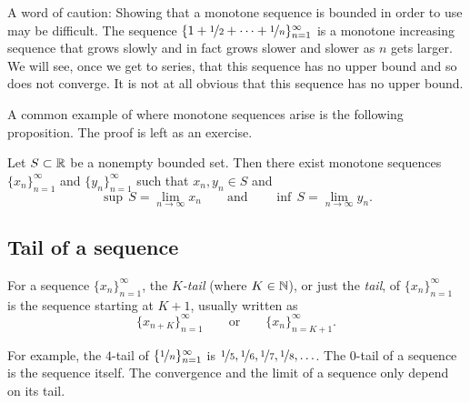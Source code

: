 \begin{example}
A word of caution:  Showing that a monotone sequence is bounded
in order to use  may be difficult.
The sequence
$\{ 1 + \nicefrac{1}{2} + \cdots + \nicefrac{1}{n} \}_{n=1}^\infty$
is a monotone increasing
sequence that grows slowly and in fact grows slower and slower as $n$ gets
larger.  We will see, once we get to series,
that this sequence has no upper bound and so does not converge.  It is not
at all obvious that this sequence has no upper bound.
\end{example}

A common example of where monotone sequences arise is the following
proposition.  The proof is left as an exercise.

\begin{prop} \label{prop:supinfseq}
Let $S \subset {\mathbb{R}}$ be a nonempty bounded set.
Then there exist monotone sequences
$\{ x_n \}_{n=1}^\infty$ and $\{ y_n \}_{n=1}^\infty$ such that $x_n, y_n \in S$ and
\begin{equation*}
\sup\,S = \lim_{n\to \infty} x_n \qquad \text{and} \qquad \inf\,S =
\lim_{n\to\infty} y_n .
\end{equation*}
\end{prop}

\subsection{Tail of a sequence}

\begin{defn}
For a sequence $\{ x_n \}_{n=1}^\infty$,
the \emph{$K$-tail} (where $K \in {\mathbb{N}}$),
or just the
\emph{tail}, of
$\{ x_n \}_{n=1}^\infty$ is the sequence starting at $K+1$, usually written as
\begin{equation*}
\{ x_{n+K} \}_{n=1}^\infty
\qquad \text{or} \qquad \{ x_n \}_{n=K+1}^\infty .
\end{equation*}
\end{defn}

For example, the $4$-tail of $\{ \nicefrac{1}{n} \}_{n=1}^\infty$ is
$\nicefrac{1}{5}, \nicefrac{1}{6}, \nicefrac{1}{7}, \nicefrac{1}{8},
\ldots$.  The $0$-tail of a sequence is the sequence itself.
The convergence and the limit of a sequence only depend on its tail.

